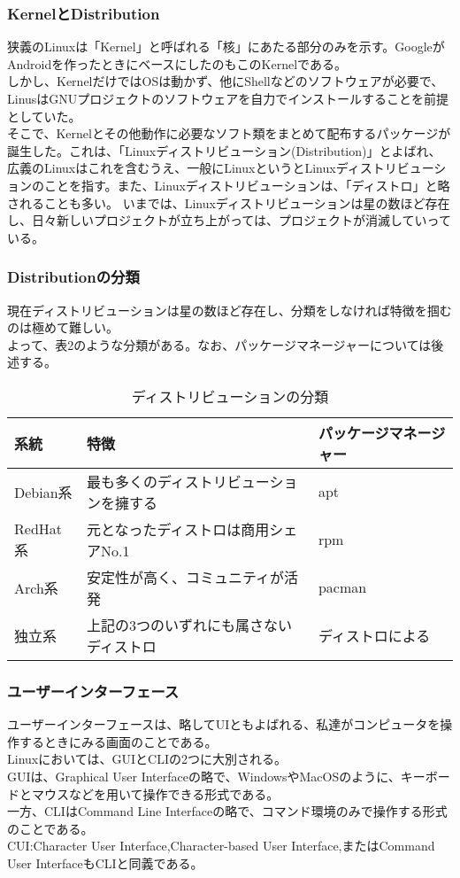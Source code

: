 \documentclass{ltjsarticle}
\begin{document}
\subsubsection{KernelとDistribution}
狭義のLinuxは「Kernel」と呼ばれる「核」にあたる部分のみを示す。GoogleがAndroidを作ったときにベースにしたのもこのKernelである。\\
しかし、KernelだけではOSは動かず、他にShellなどのソフトウェアが必要で、LinusはGNUプロジェクトのソフトウェアを自力でインストールすることを前提としていた。\\
そこで、Kernelとその他動作に必要なソフト類をまとめて配布するパッケージが誕生した。これは、「Linuxディストリビューション(Distribution)」とよばれ、広義のLinuxはこれを含むうえ、一般にLinuxというとLinuxディストリビューションのことを指す。また、Linuxディストリビューションは、「ディストロ」と略されることも多い。
いまでは、Linuxディストリビューションは星の数ほど存在し、日々新しいプロジェクトが立ち上がっては、プロジェクトが消滅していっている。
\subsubsection{Distributionの分類}
現在ディストリビューションは星の数ほど存在し、分類をしなければ特徴を掴むのは極めて難しい。\\
よって、表2のような分類がある。なお、パッケージマネージャーについては後述する。
\begin{table}
    \caption{ディストリビューションの分類}
    \begin{center}
        \begin{tabular}{lll}\hline
            系統 & 特徴 & パッケージマネージャー \\ \hline \hline
            Debian系 & 最も多くのディストリビューションを擁する & apt \\ \hline
            RedHat系 & 元となったディストロは商用シェアNo.1 & rpm \\ \hline
            Arch系 & 安定性が高く、コミュニティが活発 & pacman \\ \hline
            独立系 & 上記の3つのいずれにも属さないディストロ & ディストロによる \\ \hline
        \end{tabular}
    \end{center}
\end{table}
\subsubsection{ユーザーインターフェース}
ユーザーインターフェースは、略してUIともよばれる、私達がコンピュータを操作するときにみる画面のことである。\\
Linuxにおいては、GUIとCLIの2つに大別される。\\
GUIは、Graphical User Interfaceの略で、WindowsやMacOSのように、キーボードとマウスなどを用いて操作できる形式である。\\
一方、CLIはCommand Line Interfaceの略で、コマンド環境のみで操作する形式のことである。\\
CUI:Character User Interface,Character-based User Interface,またはCommand User InterfaceもCLIと同義である。
\end{document}
